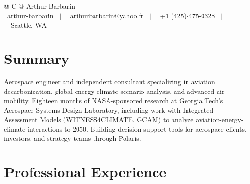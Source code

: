 \documentclass[a4paper,10pt]{article}
\begin{document}
\pagestyle{empty}

\begin{tabularx}{\linewidth}{@{} C @{}}
\huge{Arthur Barbarin} \\[7.5pt]
\href{https://www.linkedin.com/in/arthur-barbarin}{\raisebox{-0.05\height}\faLinkedin\ arthur-barbarin} \ $|$ \
\href{mailto:arthurbarbarin@yahoo.fr}{\raisebox{-0.05\height}\faEnvelope\ arthurbarbarin@yahoo.fr} \ $|$ \
{\raisebox{-0.05\height}\faPhone\ +1 (425)-475-0328} \ $|$ \
{\raisebox{-0.05\height}\faMapMarker\ Seattle, WA} \\
\end{tabularx}

\section*{Summary}
Aerospace engineer and independent consultant specializing in aviation decarbonization, global energy-climate scenario analysis, and advanced air mobility. Eighteen months of NASA-sponsored research at Georgia Tech's Aerospace Systems Design Laboratory, including work with Integrated Assessment Models (WITNESS4CLIMATE, GCAM) to analyze aviation-energy-climate interactions to 2050. Building decision-support tools for aerospace clients, investors, and strategy teams through Polaris.

\section*{Professional Experience}
\end{document}
